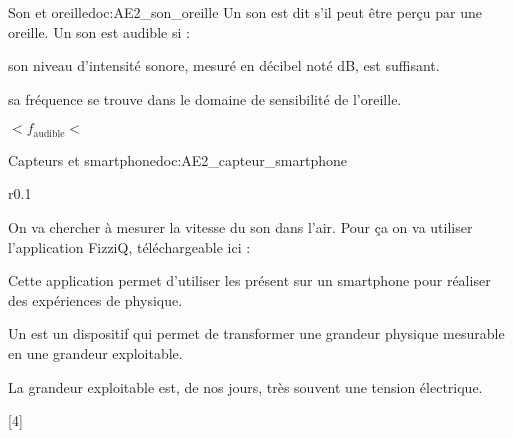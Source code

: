 \begin{doc}{Son et oreille}{doc:AE2_son_oreille}
  Un son est dit  s'il peut être perçu par une oreille.
  Un son est audible si :
  \begin{listePoints}
    \item son niveau d'intensité sonore, mesuré en décibel noté dB, est suffisant.
    \item sa fréquence se trouve dans le domaine de sensibilité de l'oreille.
  \end{listePoints}
  \begin{center}
     $< f_\text{audible} <$ 
  \end{center}
\end{doc}



\begin{doc}{Capteurs et smartphone}{doc:AE2_capteur_smartphone}
  \begin{wrapfigure}[5]{r}{0.1\linewidth}
    \vspace*{-28pt}
    \medskip
    
  \end{wrapfigure}
  On va chercher à mesurer la vitesse du son dans l'air.
  Pour ça on va utiliser l'application FizziQ, téléchargeable ici :
  
  Cette application permet d'utiliser les  présent sur un smartphone pour réaliser des expériences de physique.
  
  \begin{importants}
    Un  est un dispositif qui permet de transformer une grandeur physique mesurable en une grandeur exploitable.
  \end{importants}
  La grandeur exploitable est, de nos jours, très souvent une tension électrique.
\end{doc}

[4]

